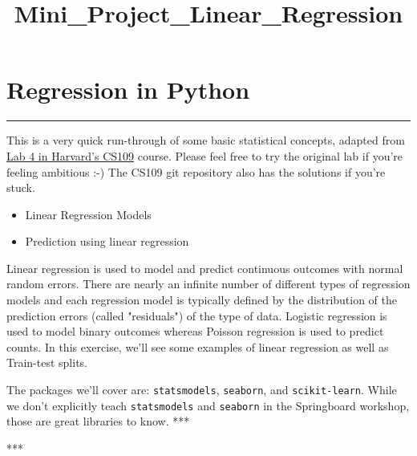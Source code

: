 \documentclass[11pt]{article}
\title{Mini\_Project\_Linear\_Regression}
\providecommand{\tightlist}{%
      \setlength{\itemsep}{0pt}\setlength{\parskip}{0pt}}
\begin{document}
    
    
    \maketitle
    
    

    
    \section{Regression in Python}\label{regression-in-python}

\begin{center}\rule{0.5\linewidth}{\linethickness}\end{center}

This is a very quick run-through of some basic statistical concepts,
adapted from \href{https://github.com/cs109/2015lab4}{Lab 4 in Harvard's
CS109} course. Please feel free to try the original lab if you're
feeling ambitious :-) The CS109 git repository also has the solutions if
you're stuck.

\begin{itemize}
\tightlist
\item
  Linear Regression Models
\item
  Prediction using linear regression
\end{itemize}

Linear regression is used to model and predict continuous outcomes with
normal random errors. There are nearly an infinite number of different
types of regression models and each regression model is typically
defined by the distribution of the prediction errors (called
"residuals") of the type of data. Logistic regression is used to model
binary outcomes whereas Poisson regression is used to predict counts. In
this exercise, we'll see some examples of linear regression as well as
Train-test splits.

The packages we'll cover are: \texttt{statsmodels}, \texttt{seaborn},
and \texttt{scikit-learn}. While we don't explicitly teach
\texttt{statsmodels} and \texttt{seaborn} in the Springboard workshop,
those are great libraries to know. ***

     ***
\end{document}
